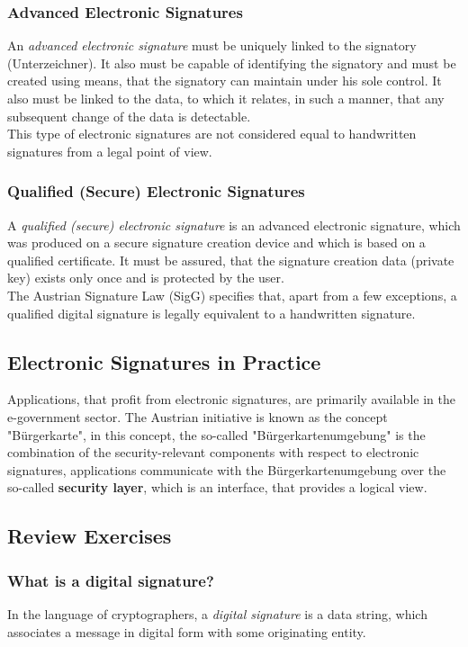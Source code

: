 \documentclass[a4paper, 10 pt, conference]{ieeeconf}
\begin{document}
\subsubsection{\textbf{Advanced Electronic Signatures}}
\label{sig:adv}
An \emph{advanced electronic signature} must be uniquely linked to the signatory (Unterzeichner). It also must be capable of identifying the signatory and must be created using means, that the signatory can maintain under his sole control. It also must be linked to the data, to which it relates, in such a manner, that any subsequent change of the data is detectable. \\
This type of electronic signatures are not considered equal to handwritten signatures from a legal point of view. 

\subsubsection{\textbf{Qualified (Secure) Electronic Signatures}}
A \emph{qualified (secure) electronic signature} is an advanced electronic signature, which was produced on a secure signature creation device and which is based on a qualified certificate. It must be assured, that the signature creation data (private key) exists only once and is protected by the user. \\
The Austrian Signature Law (SigG) specifies that, apart from a few exceptions, a qualified digital signature is legally equivalent to a handwritten signature. 


\pagebreak
\subsection{\textbf{Electronic Signatures in Practice}}
Applications, that profit from electronic signatures, are primarily available in the e-government sector. 
The Austrian initiative is known as the concept "Bürgerkarte", in this concept, the so-called "Bürgerkartenumgebung" is the combination of the security-relevant components with respect to electronic signatures, applications communicate with the Bürgerkartenumgebung over the so-called \textbf{security layer}, which is an interface, that provides a logical view. 



\subsection{\textbf{Review Exercises}}
\subsubsection{\textbf{What is a digital signature?}}
In the language of cryptographers, a \emph{digital signature} is a data string, which associates a message in digital form with some originating entity. 
\end{document}
